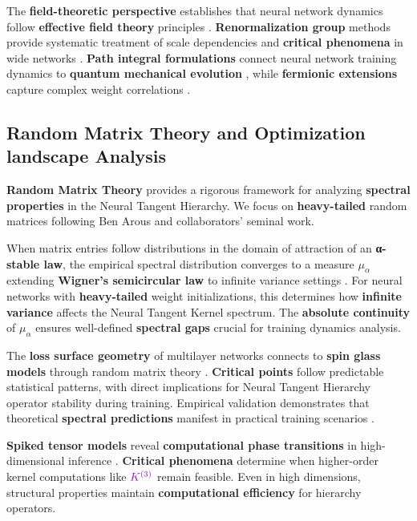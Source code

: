 \documentclass[a4paper]{article}
\theoremstyle{plain}
\theoremstyle{definition}
\theoremstyle{remark}
\begin{document}
The \textbf{field-theoretic perspective} establishes that neural network dynamics follow \textbf{effective field theory} principles \cite{liu2025efnn, jiang2025synaptic}. \textbf{Renormalization group} methods provide systematic treatment of scale dependencies and \textbf{critical phenomena} in wide networks \cite{hashimoto2022duality}. \textbf{Path integral formulations} connect neural network training dynamics to \textbf{quantum mechanical evolution} \cite{yaida2024nnqft, martyn2022variational}, while \textbf{fermionic extensions} capture complex weight correlations \cite{huang2025fermionic}.

\subsection{Random Matrix Theory and Optimization landscape Analysis}

\textbf{Random Matrix Theory} provides a rigorous framework for analyzing \textbf{spectral properties} in the Neural Tangent Hierarchy. We focus on \textbf{heavy-tailed} random matrices following Ben Arous and collaborators' seminal work.

When matrix entries follow distributions in the domain of attraction of an \textbf{α-stable law}, the empirical spectral distribution converges to a measure $\mu_\alpha$ extending \textbf{Wigner's semicircular law} to infinite variance settings \cite{benarous2007spectrum}. For neural networks with \textbf{heavy-tailed} weight initializations, this determines how \textbf{infinite variance} affects the Neural Tangent Kernel spectrum. The \textbf{absolute continuity} of $\mu_\alpha$ ensures well-defined \textbf{spectral gaps} crucial for training dynamics analysis.

The \textbf{loss surface geometry} of multilayer networks connects to \textbf{spin glass models} through random matrix theory \cite{benarous2014high_dimensional_landscapes}. \textbf{Critical points} follow predictable statistical patterns, with direct implications for Neural Tangent Hierarchy operator stability during training. Empirical validation demonstrates that theoretical \textbf{spectral predictions} manifest in practical training scenarios \cite{benarous2014high_dimensional_landscapes}.

\textbf{Spiked tensor models} reveal \textbf{computational phase transitions} in high-dimensional inference \cite{benarous2019spiked_tensor}. \textbf{Critical phenomena} determine when higher-order kernel computations like $\textcolor{k3color}{K^{(3)}}$ remain feasible. Even in high dimensions, structural properties maintain \textbf{computational efficiency} for hierarchy operators.
\end{document}
